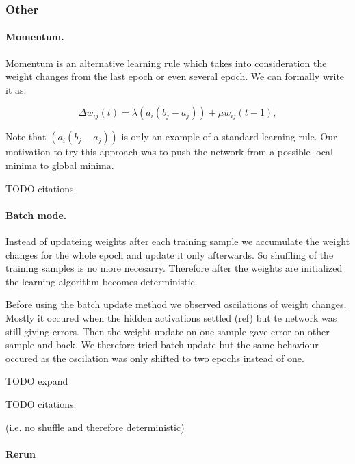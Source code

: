 
\subsubsection{Other}

\paragraph{Momentum.}

Momentum is an alternative learning rule which takes into consideration the weight changes from the last epoch or even several epoch. We can formally write it as: 

\begin{equation}
\Delta w_{ij}(t) = \lambda (a_i(b_j - a_j)) + \mu w_{ij}(t-1), 
\end{equation} 

Note that $(a_i(b_j - a_j))$ is only an example of a standard learning rule. Our motivation to try this approach was to push the network from a possible local minima to global minima. 

TODO citations.  

\paragraph{Batch mode.}

Instead of updateing weights after each training sample we accumulate the weight changes for the whole epoch and update it only afterwards. So shuffling of the training samples is no more necesarry. Therefore after the weights are initialized the learning algorithm becomes deterministic.

Before using the batch update method we observed oscilations of weight changes. Mostly it occured when the hidden activations settled (ref) but te network was still giving errors. Then the weight update on one sample gave error on other sample and back. We therefore tried batch update but the same behaviour occured as the oscilation was only shifted to two epochs instead of one.  

TODO expand 

TODO citations. 

(i.e. no shuffle and therefore deterministic)

\paragraph{Rerun} 

